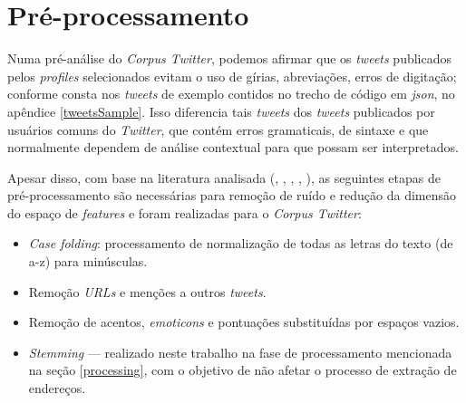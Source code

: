 \documentclass[
	12pt,				%
	oneside,			%
	a4paper,			%
	english,			%
	brazil				%
	]{abntex2ppgsi}
\begin{document}
{{\section{Pré-processamento}
\label{preprocessing}

Numa pré-análise do \textit{Corpus Twitter}, podemos afirmar que os \textit{tweets} publicados pelos \textit{profiles} selecionados evitam o uso de gírias, abreviações, erros de digitação; conforme consta nos \textit{tweets} de exemplo contidos no trecho de código em \textit{json}, no apêndice \ref{tweetsSample}.  Isso diferencia tais \textit{tweets} dos \textit{tweets} publicados por usuários comuns do \textit{Twitter}, que contém erros gramaticais, de sintaxe e que normalmente dependem de análise contextual para que possam ser interpretados.

Apesar disso, com base na literatura analisada (\cite{Steiger2015Census}, \cite{Middleton2014}, \cite{Kobdani2010}, \cite{Setiawan2017},  \cite{Zagal2016}), as seguintes etapas de pré-processamento são necessárias para remoção de ruído e redução da dimensão do espaço de \textit{features} e foram realizadas para o \textit{Corpus Twitter}:

\begin{itemize}
\item \textit{Case folding}: processamento de normalização de todas as letras do texto (de a-z) para minúsculas.
\item Remoção  \textit{URLs} e menções a outros \textit{tweets}.
\item Remoção de acentos, \textit{emoticons} e pontuações substituídas por espaços vazios.
\item \textit{Stemming} --- realizado neste trabalho na fase de processamento mencionada na seção \ref{processing}, com o objetivo de não afetar o processo de extração de endereços. 
\end{itemize}

}}
\end{document}
